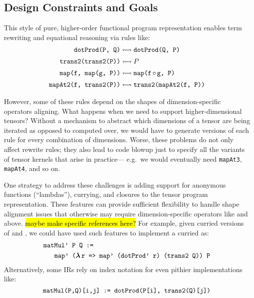 \subsection{\g Design Constraints and Goals}

This style of pure, higher-order functional
  program representation enables
  term rewriting and equational reasoning
  via rules like:
\begin{align*}
  \mcd{dotProd(P, Q)}
    & \leftrightsquigarrow
      \mcd{dotProd(Q, P)} \\[2pt]
  \mcd{trans2(trans2(P))}
    & \leftrightsquigarrow
      P \\[2pt]
  \mcd{map(f, map(g, P))}
    & \leftrightsquigarrow
      \mcd{map(f$\,\circ\,$g, P)} \\[2pt]
  \mcd{mapAt2(f, trans2(P))}
    & \leftrightsquigarrow
      \mcd{trans2(mapAt2(f, P))} %
\end{align*}


However, some of these rules depend on the
  shapes of dimension-specific operators aligning.
What happens when we need to support
  higher-dimensional tensors?
Without a mechanism to abstract
  which dimensions of a tensor
  are being iterated as opposed to computed over,
  we would have to generate versions of
  each rule for every combination of dimensions.
Worse, these problems
  do not only affect rewrite rules;
  they also lead to code blowup just to
  specify all the variants of tensor kernels
  that arise in practice---%
  e.g.~we would eventually need
  \texttt{mapAt3}, \texttt{mapAt4},
  and so on.

One strategy to address these challenges is
  adding support for anonymous functions (``lambdas''),
  currying, and closures to the 
  tensor program representation.
These features can provide sufficient
  flexibility to handle shape alignment
  issues that otherwise may require
  dimension-specific operators like
   and  above.
\hl{maybe make specific references here?}
For example, given curried versions
  of  and ,
  we could have used such features
  to implement a curried  as:
\begin{align*}
  & \mathrm{\texttt{matMul' P Q :=}} \\
  & \;\; \mathrm{\texttt{ \
      map' ($\boldsymbol\lambda\,$r =>\
        map' (dotProd' r) (trans2 Q)) P}}
\end{align*}
Alternatively, some IRs rely on index notation
  for even pithier implementations like:
$$
  \mathrm{\texttt{matMul(P,Q)[i,j] := dotProd(P[i], trans2(Q)[j])}}
$$

